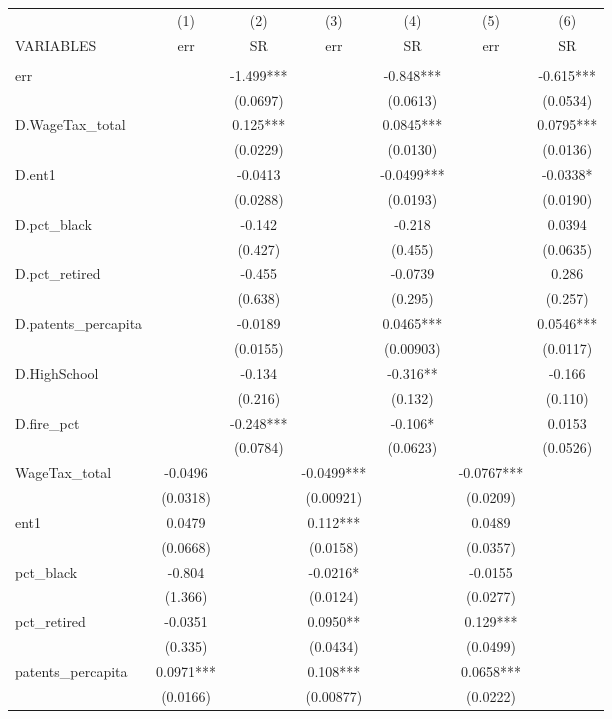 \begin{tabular}{lcccccc} \hline
 & (1) & (2) & (3) & (4) & (5) & (6) \\
VARIABLES & err & SR & err & SR & err & SR \\ \hline
 &  &  &  &  &  &  \\
err &  & -1.499*** &  & -0.848*** &  & -0.615*** \\
 &  & (0.0697) &  & (0.0613) &  & (0.0534) \\
D.WageTax\_total &  & 0.125*** &  & 0.0845*** &  & 0.0795*** \\
 &  & (0.0229) &  & (0.0130) &  & (0.0136) \\
D.ent1 &  & -0.0413 &  & -0.0499*** &  & -0.0338* \\
 &  & (0.0288) &  & (0.0193) &  & (0.0190) \\
D.pct\_black &  & -0.142 &  & -0.218 &  & 0.0394 \\
 &  & (0.427) &  & (0.455) &  & (0.0635) \\
D.pct\_retired &  & -0.455 &  & -0.0739 &  & 0.286 \\
 &  & (0.638) &  & (0.295) &  & (0.257) \\
D.patents\_percapita &  & -0.0189 &  & 0.0465*** &  & 0.0546*** \\
 &  & (0.0155) &  & (0.00903) &  & (0.0117) \\
D.HighSchool &  & -0.134 &  & -0.316** &  & -0.166 \\
 &  & (0.216) &  & (0.132) &  & (0.110) \\
D.fire\_pct &  & -0.248*** &  & -0.106* &  & 0.0153 \\
 &  & (0.0784) &  & (0.0623) &  & (0.0526) \\
WageTax\_total & -0.0496 &  & -0.0499*** &  & -0.0767*** &  \\
 & (0.0318) &  & (0.00921) &  & (0.0209) &  \\
ent1 & 0.0479 &  & 0.112*** &  & 0.0489 &  \\
 & (0.0668) &  & (0.0158) &  & (0.0357) &  \\
pct\_black & -0.804 &  & -0.0216* &  & -0.0155 &  \\
 & (1.366) &  & (0.0124) &  & (0.0277) &  \\
pct\_retired & -0.0351 &  & 0.0950** &  & 0.129*** &  \\
 & (0.335) &  & (0.0434) &  & (0.0499) &  \\
patents\_percapita & 0.0971*** &  & 0.108*** &  & 0.0658*** &  \\
 & (0.0166) &  & (0.00877) &  & (0.0222) &  \\

\end{tabular}
